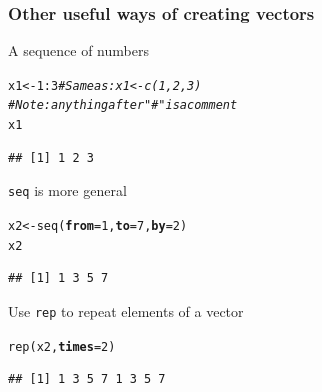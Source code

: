 \documentclass[color=usenames,dvipsnames]{beamer}\usepackage[]{graphicx}\usepackage[]{color}
\makeatletter
\newcommand{\hlnum}[1]{\textcolor[rgb]{0.69,0.494,0}{#1}}%
\newcommand{\hlcom}[1]{\textcolor[rgb]{0.514,0.506,0.514}{\textit{#1}}}%
\newcommand{\hlopt}[1]{\textcolor[rgb]{0,0,0}{#1}}%
\newcommand{\hlstd}[1]{\textcolor[rgb]{0,0,0}{#1}}%
\newcommand{\hlkwb}[1]{\textcolor[rgb]{0,0.341,0.682}{#1}}%
\newcommand{\hlkwc}[1]{\textcolor[rgb]{0,0,0}{\textbf{#1}}}%
\newcommand{\hlkwd}[1]{\textcolor[rgb]{0.004,0.004,0.506}{#1}}%
\newenvironment{kframe}{%
 \def\at@end@of@kframe{}%
 \ifinner\ifhmode%
  \def\at@end@of@kframe{\end{minipage}}%
  \begin{minipage}{\columnwidth}%
 \fi\fi%
 \def\FrameCommand##1{\hskip\@totalleftmargin \hskip-\fboxsep
 \colorbox{shadecolor}{##1}\hskip-\fboxsep
     \hskip-\linewidth \hskip-\@totalleftmargin \hskip\columnwidth}%
 \MakeFramed {\advance\hsize-\width
   \@totalleftmargin\z@ \linewidth\hsize
   \@setminipage}}%
 {\par\unskip\endMakeFramed%
 \at@end@of@kframe}
\newenvironment{knitrout}{}{} %
\newcommand{\inr}[1]{\colorbox{inlinecolor}{\texttt{#1}}}
\makeatother
\begin{document}


%


\begin{frame}[fragile]
  \frametitle{Other useful ways of creating vectors}
A sequence of numbers
\begin{knitrout}\small
{}\color{fgcolor}\begin{kframe}
\begin{alltt}
\hlstd{x1} \hlkwb{<-} \hlnum{1}\hlopt{:}\hlnum{3} \hlcom{# Same as: x1 <- c(1, 2, 3)}
          \hlcom{# Note: anything after "#" is a comment}
\hlstd{x1}
\end{alltt}
\begin{verbatim}
## [1] 1 2 3
\end{verbatim}
\end{kframe}
\end{knitrout}
\inr{seq} is more general
\begin{knitrout}\small
{}\color{fgcolor}\begin{kframe}
\begin{alltt}
\hlstd{x2} \hlkwb{<-} \hlkwd{seq}\hlstd{(}\hlkwc{from}\hlstd{=}\hlnum{1}\hlstd{,} \hlkwc{to}\hlstd{=}\hlnum{7}\hlstd{,} \hlkwc{by}\hlstd{=}\hlnum{2}\hlstd{)}
\hlstd{x2}
\end{alltt}
\begin{verbatim}
## [1] 1 3 5 7
\end{verbatim}
\end{kframe}
\end{knitrout}
Use \inr{rep} to repeat elements of a vector
\begin{knitrout}\small
{}\color{fgcolor}\begin{kframe}
\begin{alltt}
\hlkwd{rep}\hlstd{(x2,} \hlkwc{times}\hlstd{=}\hlnum{2}\hlstd{)}
\end{alltt}
\begin{verbatim}
## [1] 1 3 5 7 1 3 5 7
\end{verbatim}
\end{kframe}
\end{knitrout}
\end{frame}
\end{document}
